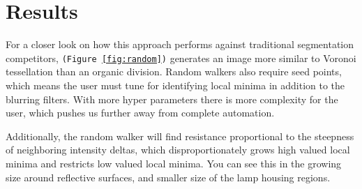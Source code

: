 \documentclass[11pt,twocolumn]{article} %
\begin{document}
\section{Results}

For a closer look on how this approach performs against traditional segmentation competitors, \texttt{(Figure~\ref{fig:random})} generates an image more similar to Voronoi tessellation than an organic division. Random walkers also require seed points, which means the user must tune for identifying local minima in addition to the blurring filters. With more hyper parameters there is more complexity for the user, which pushes us further away from complete automation.

Additionally, the random walker will find resistance proportional to the steepness of neighboring intensity deltas, which disproportionately grows high valued local minima and restricts low valued local minima. You can see this in the growing size around reflective surfaces, and smaller size of the lamp housing regions.
\end{document}
